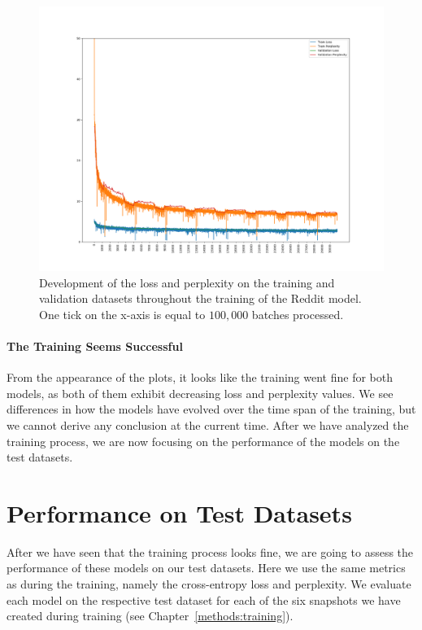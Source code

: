 \begin{figure}[H]
	\includegraphics[width=\linewidth]{img/plots/reddit/train_metrics.png}
	\caption{Development of the loss and perplexity on the training and validation datasets throughout the training of the Reddit model. One tick on the x-axis is equal to $100,000$ batches processed.}
	\label{results:learning_process:metrics:reddit}
\end{figure} 

\paragraph{The Training Seems Successful} From the appearance of the plots, it looks like the training went fine for both models, as both of them exhibit decreasing loss and perplexity values. We see differences in how the models have evolved over the time span of the training, but we cannot derive any conclusion at the current time. After we have analyzed the training process, we are now focusing on the performance of the models on the test datasets.

\section{Performance on Test Datasets}
\label{results:performance_on_test_datasets}
After we have seen that the training process looks fine, we are going to assess the performance of these models on our test datasets. Here we use the same metrics as during the training, namely the cross-entropy loss and perplexity. We evaluate each model on the respective test dataset for each of the six snapshots we have created during training (see Chapter~\ref{methods:training}).


